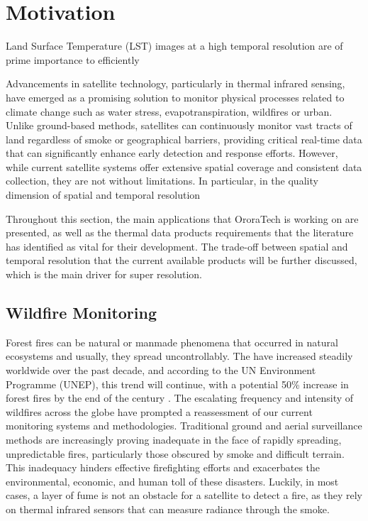     
    

\section{Motivation}

Land Surface Temperature (LST) images at a high temporal resolution are of prime importance to efficiently 

Advancements in satellite technology, particularly in thermal infrared sensing, have emerged as a promising solution to monitor physical processes related to climate change such as water stress, evapotranspiration, wildfires or urban.
Unlike ground-based methods, satellites can continuously monitor vast tracts of land regardless of smoke or geographical barriers, providing critical real-time data that can significantly enhance early detection and response efforts. 
However, while current satellite systems offer extensive spatial coverage and consistent data collection, they are not without limitations. 
In particular, in the quality dimension of spatial and temporal resolution

Throughout this section, the main applications that OroraTech is working on are presented, as well as the thermal data products requirements that the literature has identified as vital for their development.
The trade-off between spatial and temporal resolution that the current available products will be further discussed, which is the main driver for super resolution.
    

    \subsection{Wildfire Monitoring}

    Forest fires can be natural or manmade phenomena that occurred in natural ecosystems and usually, they spread uncontrollably.
    The have increased steadily worldwide over the past decade, and according to the UN Environment Programme (UNEP), this trend will continue, with a potential 50\% increase in forest fires by the end of the century \cite{UNEP2021Wildfire}. 
    The escalating frequency and intensity of wildfires across the globe have prompted a reassessment of our current monitoring systems and methodologies. Traditional ground and aerial surveillance methods are increasingly proving inadequate in the face of rapidly spreading, unpredictable fires, particularly those obscured by smoke and difficult terrain. This inadequacy hinders effective firefighting efforts and exacerbates the environmental, economic, and human toll of these disasters. 
    Luckily, in most cases, a layer of fume is not an obstacle for a satellite to detect a fire, as they rely on thermal infrared sensors that can measure radiance through the smoke.


